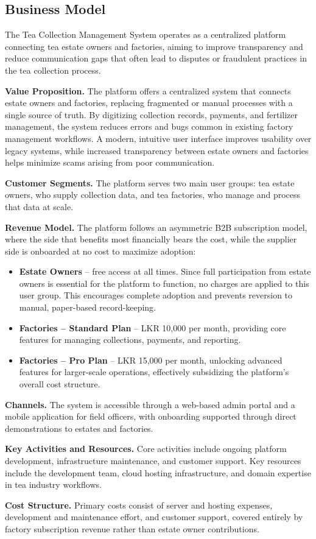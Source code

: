 \subsection{Business Model}

The Tea Collection Management System operates as a centralized platform connecting tea estate owners
and factories, aiming to improve transparency and reduce communication gaps
that often lead to disputes or fraudulent practices in the tea collection
process.

\textbf{Value Proposition.} The platform offers a centralized system that
connects estate owners and factories, replacing fragmented or manual
processes with a single source of truth. By digitizing collection records,
payments, and fertilizer management, the system reduces errors and bugs
common in existing factory management workflows. A modern, intuitive user
interface improves usability over legacy systems, while increased
transparency between estate owners and factories helps minimize scams
arising from poor communication.

\textbf{Customer Segments.} The platform serves two main user groups: tea
estate owners, who supply collection data, and tea factories, who manage
and process that data at scale.

\textbf{Revenue Model.} The platform follows an asymmetric B2B subscription
model, where the side that benefits most financially bears the cost, while
the supplier side is onboarded at no cost to maximize adoption:
\begin{itemize}
    \item \textbf{Estate Owners} -- free access at all times. Since
    full participation from estate owners is essential for the platform
    to function, no charges are applied to this user group. This
    encourages complete adoption and prevents reversion to manual,
    paper-based record-keeping.
    \item \textbf{Factories -- Standard Plan} -- LKR 10,000 per month,
    providing core features for managing collections, payments, and
    reporting.
    \item \textbf{Factories -- Pro Plan} -- LKR 15,000 per month,
    unlocking advanced features for larger-scale operations, effectively
    subsidizing the platform's overall cost structure.
\end{itemize}

\textbf{Channels.} The system is accessible through a web-based admin
portal and a mobile application for field officers, with onboarding
supported through direct demonstrations to estates and factories.

\textbf{Key Activities and Resources.} Core activities include ongoing
platform development, infrastructure maintenance, and customer support.
Key resources include the development team, cloud hosting infrastructure,
and domain expertise in tea industry workflows.

\textbf{Cost Structure.} Primary costs consist of server and hosting
expenses, development and maintenance effort, and customer support,
covered entirely by factory subscription revenue rather than estate
owner contributions.